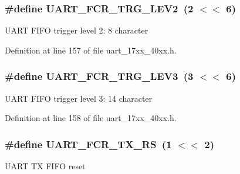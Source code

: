 \subsubsection[{\texorpdfstring{U\+A\+R\+T\+\_\+\+F\+C\+R\+\_\+\+T\+R\+G\+\_\+\+L\+E\+V2}{UART_FCR_TRG_LEV2}}]{\setlength{\rightskip}{0pt plus 5cm}\#define U\+A\+R\+T\+\_\+\+F\+C\+R\+\_\+\+T\+R\+G\+\_\+\+L\+E\+V2~(2 $<$$<$ 6)}\hypertarget{group__UART__17XX__40XX_ga7b655aba90b695210e7ce9f7b00cea89}{}\label{group__UART__17XX__40XX_ga7b655aba90b695210e7ce9f7b00cea89}
U\+A\+RT F\+I\+FO trigger level 2\+: 8 character 

Definition at line 157 of file uart\+\_\+17xx\+\_\+40xx.\+h.

\subsubsection[{\texorpdfstring{U\+A\+R\+T\+\_\+\+F\+C\+R\+\_\+\+T\+R\+G\+\_\+\+L\+E\+V3}{UART_FCR_TRG_LEV3}}]{\setlength{\rightskip}{0pt plus 5cm}\#define U\+A\+R\+T\+\_\+\+F\+C\+R\+\_\+\+T\+R\+G\+\_\+\+L\+E\+V3~(3 $<$$<$ 6)}\hypertarget{group__UART__17XX__40XX_ga9e6ef12c7a1f3514d6e30d7548ed3e46}{}\label{group__UART__17XX__40XX_ga9e6ef12c7a1f3514d6e30d7548ed3e46}
U\+A\+RT F\+I\+FO trigger level 3\+: 14 character 

Definition at line 158 of file uart\+\_\+17xx\+\_\+40xx.\+h.

\subsubsection[{\texorpdfstring{U\+A\+R\+T\+\_\+\+F\+C\+R\+\_\+\+T\+X\+\_\+\+RS}{UART_FCR_TX_RS}}]{\setlength{\rightskip}{0pt plus 5cm}\#define U\+A\+R\+T\+\_\+\+F\+C\+R\+\_\+\+T\+X\+\_\+\+RS~(1 $<$$<$ 2)}\hypertarget{group__UART__17XX__40XX_ga1c1a83fcacf333309330eea460d8a6a6}{}\label{group__UART__17XX__40XX_ga1c1a83fcacf333309330eea460d8a6a6}
U\+A\+RT TX F\+I\+FO reset 

